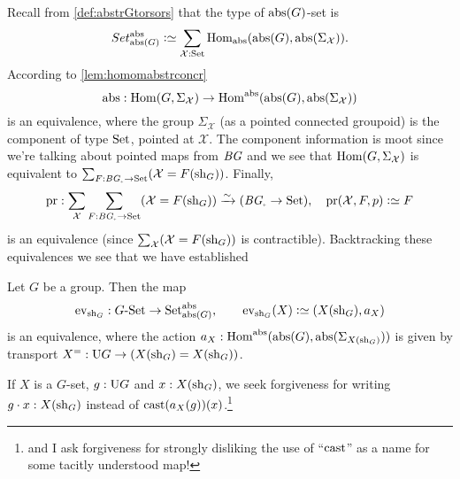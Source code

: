 Recall from \cref{def:abstrGtorsors} that the type of $\mathrm{abs}(G)$-set is
$$Set_{\abstr(G)}^\abstr\defequi \sum_{\mathcal X:\Set}\Hom_\abstr({\abstr(G)},\abstr(\Sigma_{\mathcal X})).$$
According to \cref{lem:homomabstrconcr}
$$\abstr:\Hom(G,\Sigma_{\mathcal X})\to\Hom^\abstr(\abstr(G),\abstr(\Sigma_{\mathcal X}))$$
is an equivalence, where the group $\Sigma_{\mathcal X}$ (as a pointed connected groupoid) is the component of type $\mathrm{Set}$, pointed at $\mathcal X$.  The component information is moot since we're talking about pointed maps from $\mathit{B}\mathit{G}$ and we see that $\Hom(G,\Sigma_{\mathcal X})$ is equivalent to $\sum_{F:\BG_\div\to\Set}(\mathcal X=F(\sh_G))$.  Finally, 
$$\mathrm{pr}:\sum_{\mathcal X}\sum_{F:\BG_\div\to\Set}(\mathcal X=F(\sh_G))\we 
(\BG_\div\to\Set),\quad \mathrm{pr}(\mathcal X,F,p)\defequi F
$$
is an equivalence (since $\sum_{\mathcal X}(\mathcal X=F(\mathrm{sh}_G))$ is contractible).  
Backtracking these equivalences we see that we have established
\begin{lemma}
  \label{lem:actionsconcreteandabstract}
  Let $G$ be a group.  Then the map
  $$\ev_{\sh_G}:\GSet\to\Set^\abstr_{\abstr(G)},\qquad \ev_{\sh_G}(X)\defequi(X(\sh_G),a_X)
$$
is an equivalence, where the action $a_X:\Hom^\abstr(\abstr(G), \abstr(\Sigma_{X(\sh_G)}))$ is given by transport $X^=:\mathrm{U} G\to (X(\mathrm{sh}_G)=X(\mathrm{sh}_G))$.
\end{lemma}
If $X$ is a $G$-set, $g:\mathrm{U} G$ and $x:X(\mathrm{sh}_G)$, we seek forgiveness for writing $g\cdot x:X(\mathrm{sh}_G)$ instead of $\cast(a_X(g))(x)$.\footnote{and I ask forgiveness for strongly disliking the use of ``$\cast$'' as a name for some tacitly understood map!}

